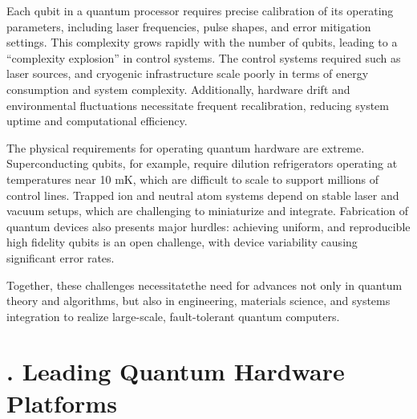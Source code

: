 \documentclass{elbioimp2}
\begin{document}
Each qubit in a quantum processor requires precise calibration of its operating parameters, including laser frequencies, pulse shapes, and error mitigation settings. This complexity grows rapidly with the number of qubits, leading to a “complexity explosion” in control systems. The control systems required such as laser sources, and cryogenic infrastructure scale poorly in terms of energy consumption and system complexity. Additionally, hardware drift and environmental fluctuations necessitate frequent recalibration, reducing system uptime and computational efficiency.

The physical requirements for operating quantum hardware are extreme. Superconducting qubits, for example, require dilution refrigerators operating at temperatures near 10 mK, which are difficult to scale to support millions of control lines. Trapped ion and neutral atom systems depend on stable laser and vacuum setups, which are challenging to miniaturize and integrate. Fabrication of quantum devices also presents major hurdles: achieving uniform, and reproducible high fidelity qubits is an open challenge, with device variability causing significant error rates.

Together, these challenges necessitatethe need for advances not only in quantum theory and algorithms, but also in engineering, materials science, and systems integration to realize large-scale, fault-tolerant quantum computers.

\section{. Leading Quantum Hardware Platforms}
\end{document}
